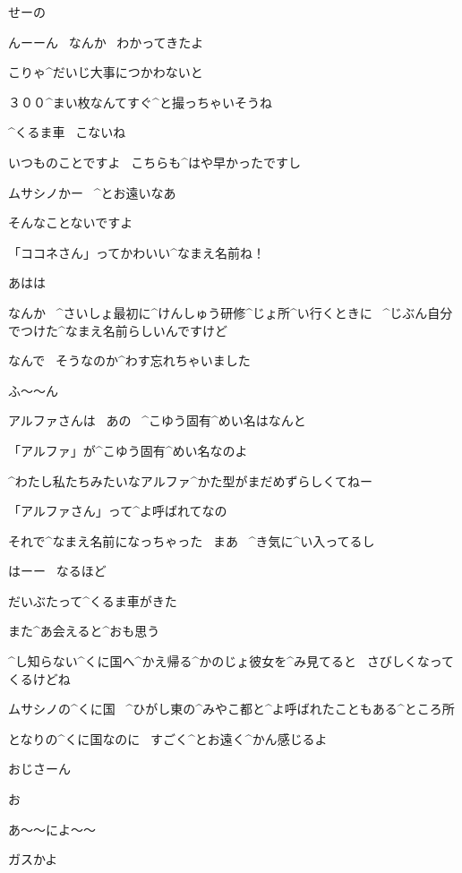 \page[26]
\Alpha せーの

\Alpha んーーん
\ なんか
\ わかってきたよ

\Alpha こりゃ^{だいじ}{大事}につかわないと

\Alpha ３００^{まい}{枚}なんてすぐ^{と}{撮}っちゃいそうね

\page[27]
\Alpha ^{くるま}{車}
\ こないね

\Kokone いつものことですよ
\ こちらも^{はや}{早}かったですし

\page[28]
\Alpha ムサシノかー
\ ^{とお}{遠}いなあ

\Kokone そんなことないですよ

\Alpha 「ココネさん」ってかわいい^{なまえ}{名前}ね！

\Kokone あはは

\Kokone なんか
\ ^{さいしょ}{最初}に^{けんしゅう}{研修}^{じょ}{所}^{い}{行}くときに
\ ^{じぶん}{自分}でつけた^{なまえ}{名前}らしいんですけど

\Kokone なんで
\ そうなのか^{わす}{忘}れちゃいました

\Alpha ふ〜〜ん

\page[29]
\Kokone アルファさんは
\ あの
\ ^{こゆう}{固有}^{めい}{名}はなんと

\Alpha 「アルファ」が^{こゆう}{固有}^{めい}{名}なのよ

\Alpha ^{わたし}{私}たちみたいなアルファ^{かた}{型}がまだめずらしくてねー

\Alpha 「アルファさん」って^{よ}{呼}ばれてなの

\Alpha それで^{なまえ}{名前}になっちゃった
\ まあ
\ ^{き}{気}に^{い}{入}ってるし

\Kokone はーー
\ なるほど

\page[30]
\Alpha だいぶたって^{くるま}{車}がきた

\Alpha また^{あ}{会}えると^{おも}{思}う

\Alpha ^{し}{知}らない^{くに}{国}へ^{かえ}{帰}る^{かのじょ}{彼女}を^{み}{見}てると
\ さびしくなってくるけどね

\page[31]
\Alpha ムサシノの^{くに}{国}
\ ^{ひがし}{東}の^{みやこ}{都}と^{よ}{呼}ばれたこともある^{ところ}{所}

\Alpha となりの^{くに}{国}なのに
\ すごく^{とお}{遠}く^{かん}{感}じるよ

\page[32]
\Alpha おじさーん

\Ojisan お

\Ojisan あ〜〜によ〜〜

\page[33]
\Ojisan ガスかよ

